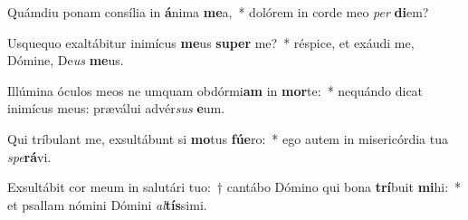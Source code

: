 \item Quámdiu ponam consília in \textbf{á}nima \textbf{me}a,~* dolórem in corde meo \textit{per} \textbf{di}em?
\item Usquequo exaltábitur inimícus \textbf{me}us \textbf{su}\textbf{per} me?~* réspice, et exáudi me, Dómine, De\textit{us} \textbf{me}us.
\item Illúmina óculos meos ne umquam obdórmi\textbf{am} in \textbf{mor}te:~* nequándo dicat inimícus meus: præválui advér\textit{sus} \textbf{e}um.
\item Qui tríbulant me, exsultábunt si \textbf{mo}tus \textbf{fú}\textbf{e}ro:~* ego autem in misericórdia tua \textit{spe}\textbf{rá}vi.
\item Exsultábit cor meum in salutári tuo:~† cantábo Dómino qui bona \textbf{trí}buit \textbf{mi}hi:~* et psallam nómini Dómini \textit{al}\textbf{tís}simi.

